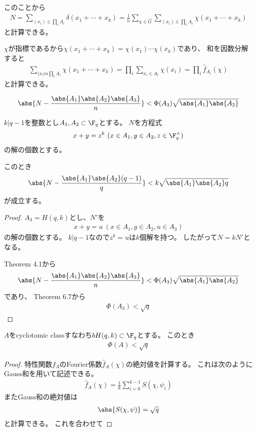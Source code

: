 \documentclass{jsarticle}
\begin{document}
このことから
\begin{align*}
N=\sum_{(x_i)\in\prod_iA_i}\delta(x_1+\cdots+x_k)=\frac{1}{n}\sum_{\chi\in\hat{G}}\sum_{(x_i)\in\prod_iA_i}\chi(x_1+\cdots+x_k)
\end{align*}
と計算できる。

$\chi$が指標であるから$\chi(x_1+\cdots+x_k)=\chi(x_1)\cdots\chi(x_k)$であり、
和を因数分解すると
\begin{align*}
\sum_{(x_iin\prod_iA_i}\chi(x_1+\cdots+x_k)=\prod_i\sum_{x_i\in A_i}\chi(x_i)=\prod_i\hat{f}_{A_i}(\chi)
\end{align*}
と計算できる。

\begin{thm}[Theorem 4.1]
\begin{align*}
\abs{N-\frac{\abs{A_1}\abs{A_2}\abs{A_3}}{n}}<\Phi(A_3)\sqrt{\abs{A_1}\abs{A_2}}
\end{align*}
\end{thm}


\begin{thm}[Theorem 7.1]
$k\vert q-1$を整数とし$A_1,A_2\subset \F_q$とする。
$N$を方程式
\begin{align*}
x+y=z^k~(x\in A_1,y\in A_2, z\in\F_q^\times)
\end{align*}
の解の個数とする。

このとき
\begin{align*}
\abs{N-\frac{\abs{A_1}\abs{A_2}(q-1)}{q}}<k\sqrt{\abs{A_1}\abs{A_2}q}
\end{align*}
が成立する。
\end{thm}
\begin{proof}
$A_3=H(q,k)$とし、$N'$を
\begin{align*}
x+y=u~(x\in A_1, y\in A_2, u\in A_3)
\end{align*}
の解の個数とする。
$k\vert q-1$なので$z^k=u$は$k$個解を持つ。
したがって$N=kN'$となる。

Theorem 4.1から
\begin{align*}
\abs{N-\frac{\abs{A_1}\abs{A_2}\abs{A_3}}{n}}<\Phi(A_3)\sqrt{\abs{A_1}\abs{A_2}}
\end{align*}
であり、
Theorem 6.7から
\begin{align*}
\Phi(A_3)<\sqrt{q}
\end{align*}
\end{proof}

\begin{thm}[Theorem 6.8]
$A$をcyclotomic classすなわち$bH(q,k)\subset \F_q$とする。
このとき
\begin{align*}
\Phi(A)<\sqrt{q}
\end{align*}
\end{thm}
\begin{proof}
特性関数$f_A$のFourier係数$\hat{f}_A(\chi)$の絶対値を計算する。
これは次のようにGauss和を用いて記述できる。
\begin{align*}
\hat{f}_A(\chi)=\frac{1}{k}\sum_{i=0}^{k-1}S(\chi,\psi_i)
\end{align*}
またGauss和の絶対値は
\begin{align*}
\abs{S(\chi,\psi)}=\sqrt{q}
\end{align*}
と計算できる。
これを合わせて
\end{proof}
\end{document}
